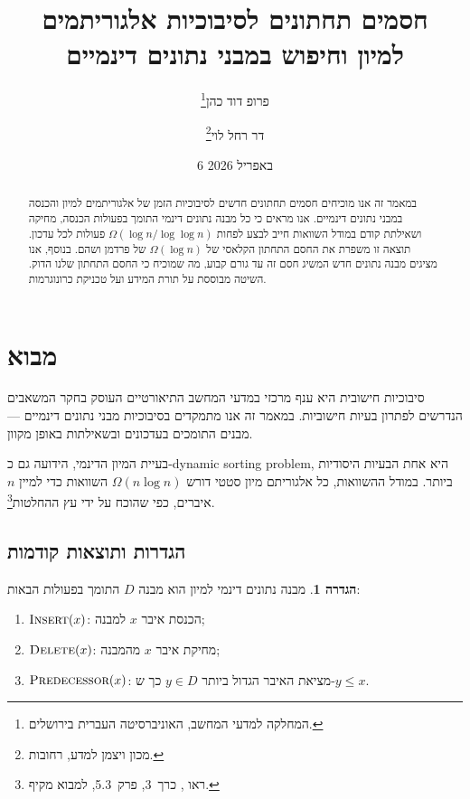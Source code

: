 \documentclass[12pt,a4paper]{article}
\title{חסמים תחתונים לסיבוכיות אלגוריתמים\\
למיון וחיפוש במבני נתונים דינמיים}
\author{%
  פרופ דוד כהן\thanks{המחלקה למדעי המחשב, האוניברסיטה העברית בירושלים.}
  \and
  דר רחל לוי\thanks{מכון ויצמן למדע, רחובות.}
}
\date{6 באפריל 2026}
\theoremstyle{plain}
\theoremstyle{definition}
\newtheorem{definition}[theorem]{הגדרה}
\theoremstyle{remark}
\begin{document}
\maketitle

\begin{abstract}
במאמר זה אנו מוכיחים חסמים תחתונים חדשים לסיבוכיות הזמן של אלגוריתמים
למיון והכנסה במבני נתונים דינמיים. אנו מראים כי כל מבנה נתונים דינמי
התומך בפעולות הכנסה, מחיקה ושאילתת קודם במודל השוואות חייב לבצע
לפחות $\Omega(\log n / \log \log n)$ פעולות לכל עדכון. תוצאה זו משפרת
את החסם התחתון הקלאסי של $\Omega(\log n)$ של פרדמן ושהם. בנוסף, אנו
מציגים מבנה נתונים חדש המשיג חסם זה עד גורם קבוע, מה שמוכיח כי
החסם התחתון שלנו הדוק. השיטה מבוססת על תורת המידע ועל טכניקת כרונוגרמות.
\end{abstract}

\tableofcontents

\section{מבוא}
\label{sec:intro}

סיבוכיות חישובית היא ענף מרכזי במדעי המחשב התיאורטיים העוסק
בחקר המשאבים הנדרשים לפתרון בעיות חישוביות. במאמר זה אנו
מתמקדים בסיבוכיות מבני נתונים דינמיים --- מבנים התומכים
בעדכונים ובשאילתות באופן מקוון.

בעיית המיון הדינמי, הידועה גם כ-dynamic sorting problem, היא
אחת הבעיות היסודיות ביותר. במודל ההשוואות, כל אלגוריתם מיון
סטטי דורש $\Omega(n \log n)$ השוואות כדי למיין $n$ איברים,
כפי שהוכח על ידי עץ ההחלטות\footnote{%
ראו \citet{knuth1998}, כרך~3, פרק~5.3, למבוא מקיף.}.

\subsection{הגדרות ותוצאות קודמות}

\begin{definition}
\label{def:dynamic_ds}
מבנה נתונים דינמי למיון הוא מבנה $D$ התומך בפעולות הבאות:
\begin{enumerate}[label=(\alph*)]
  \item $\textsc{Insert}(x)$: הכנסת איבר $x$ למבנה;
  \item $\textsc{Delete}(x)$: מחיקת איבר $x$ מהמבנה;
  \item $\textsc{Predecessor}(x)$: מציאת האיבר הגדול ביותר $y \in D$ כך ש-$y \leq x$.
\end{enumerate}
\end{definition}
\end{document}
